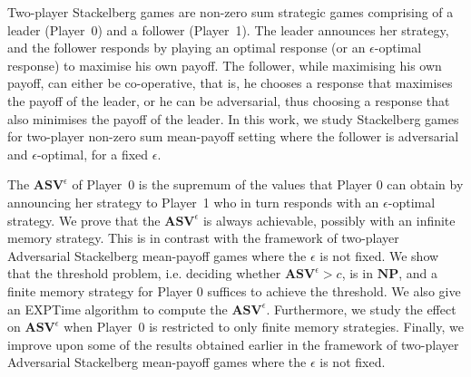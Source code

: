 Two-player Stackelberg games are non-zero sum strategic games comprising of a leader (Player~0) and a follower (Player~1). The leader announces her strategy, and the follower responds by playing an optimal response (or an $\epsilon$-optimal response) to maximise his own payoff. The follower, while maximising his own payoff, can either be co-operative, that is, he chooses a response that maximises the payoff of the leader, or he can be adversarial, thus choosing a response that also minimises the payoff of the leader. In this work, we study Stackelberg games for two-player non-zero sum mean-payoff setting where the follower is adversarial and $\epsilon$-optimal, for a fixed $\epsilon$.

The $\mathbf{ASV}^{\epsilon}$ of Player~0 is the supremum of the values that Player 0 can obtain by announcing her strategy to Player~1 who in turn responds with an $\epsilon$-optimal strategy.
We prove that the $\mathbf{ASV}^{\epsilon}$ is always achievable, possibly with an infinite memory strategy.
This is in contrast with the framework of two-player Adversarial Stackelberg mean-payoff games where the $\epsilon$ is not fixed.
We show that the threshold problem, i.e. deciding whether $\mathbf{ASV}^{\epsilon} > c$, is in $\textbf{NP}$, and a finite memory strategy for Player 0 suffices to achieve the threshold.
We also give an {\sf EXPTime} algorithm to compute the $\mathbf{ASV}^{\epsilon}$.
Furthermore, we study the effect on $\mathbf{ASV}^{\epsilon}$ when Player~0 is restricted to only finite memory strategies.
Finally, we improve upon some of the results obtained earlier in the framework of two-player Adversarial Stackelberg mean-payoff games where the $\epsilon$ is not fixed.

